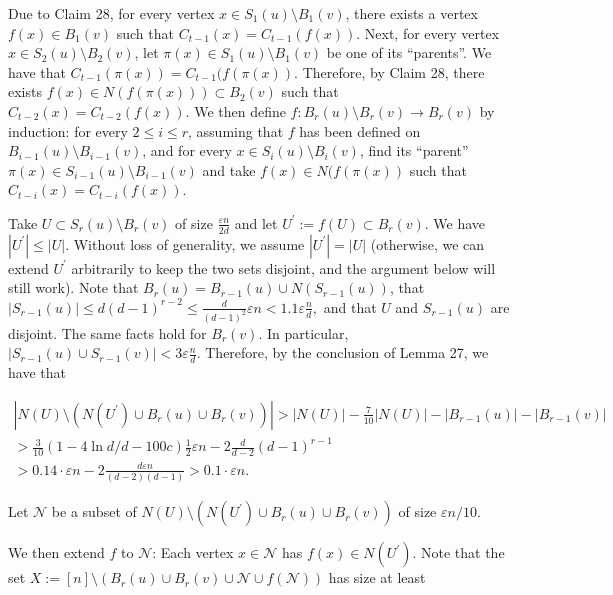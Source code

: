 \documentclass[10pt,a4paper]{article}
\begin{document}
Due to Claim 28, for every vertex $x\in S_{1}(u)\setminus B_{1}(v)$, there exists a vertex $f(x)\in B_{1}(v)$ such that $C_{t-1}(x)=C_{t-1}(f(x))$. Next, for every vertex $x\in S_{2}(u)\setminus B_{2}(v)$, let $\pi(x)\in S_{1}(u)\setminus B_{1}(v)$ be one of its “parents”. We have that $C_{t-1}(\pi(x))=C_{t-1}(f(\pi(x))$. Therefore, by Claim 28, there exists $f(x)\in N(f(\pi(x)))\subset B_{2}(v)$ such that $C_{t-2}(x)=C_{t-2}(f(x))$. We then define $f:B_{r}(u)\setminus B_{r}(v)\to B_{r}(v)$ by induction: for every $2\leq i\leq r$, assuming that $f$ has been defined on $B_{i-1}(u)\setminus B_{i-1}(v)$, and for every $x\in S_{i}(u)\setminus B_{i}(v)$, find its “parent” $\pi(x)\in S_{i-1}(u)\setminus B_{i-1}(v)$ and take $f(x)\in N(f(\pi(x))$ such that $C_{t-i}(x)=C_{t-i}(f(x))$.\par




Take $U\subset S_{r}(u)\setminus B_{r}(v)$ of size $\frac{\varepsilon n}{2d}$ and let $U^{\prime}:=f(U)\subset B_{r}(v)$. We have $|U^{\prime}|\leq|U|$. Without loss of generality, we assume $|U^{\prime}|=|U|$ (otherwise, we can extend $U^{\prime}$ arbitrarily to keep the two sets disjoint, and the argument below will still work). Note that $B_{r}(u)=B_{r-1}(u)\cup N(S_{r-1}(u))$, that
$|S_{r-1}(u)|\leq d(d-1)^{r-2}\leq\frac{d}{(d-1)^{2}}\varepsilon n<1.1\varepsilon\frac{n}{d},$
and that $U$ and $S_{r-1}(u)$ are disjoint. The same facts hold for $B_{r}(v)$. In particular,
$|S_{r-1}(u)\cup S_{r-1}(v)|<3\varepsilon\frac{n}{d}$.
Therefore, by the conclusion of Lemma 27, we have that\par


\[\begin{gathered}
\displaystyle|N(U)\setminus(N(U^{\prime})\cup B_{r}(u)\cup B_{r}(v))| \displaystyle>|N(U)|-\frac{7}{10}|N(U)|-|B_{r-1}(u)|-|B_{r-1}(v)| \\
\displaystyle>\frac{3}{10}(1-4\ln d/d-100c)\frac{1}{2}\varepsilon n-2\frac{d}{d-2}(d-1)^{r-1} \\
\displaystyle>0.14\cdot\varepsilon n-2\frac{d\varepsilon n}{(d-2)(d-1)}>0.1\cdot\varepsilon n.
\end{gathered}\]


Let $\mathcal{N}$ be a subset of $N(U)\setminus(N(U^{\prime})\cup B_{r}(u)\cup B_{r}(v))$ of size $\varepsilon n/10$.\par




We then extend $f$ to $\mathcal{N}$: Each vertex $x\in\mathcal{N}$ has $f(x)\in N(U^{\prime})$. Note that the set $X:=[n]\setminus(B_{r}(u)\cup B_{r}(v)\cup\mathcal{N}\cup f(\mathcal{N}))$
has size at least\par
\end{document}
